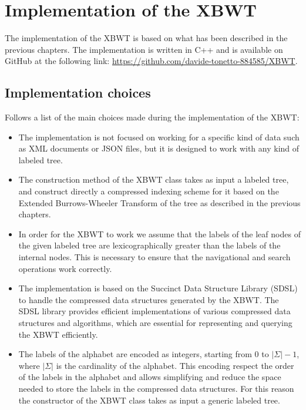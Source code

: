 \section{Implementation of the XBWT}

The implementation of the XBWT is based on what has been described in the previous chapters. The implementation is written in C++ and is available on GitHub at the following link: \url{https://github.com/davide-tonetto-884585/XBWT}.

\subsection{Implementation choices}
Follows a list of the main choices made during the implementation of the XBWT:
\begin{itemize}
    \item The implementation is not focused on working for a specific kind of data such as XML documents or JSON files, but it is designed to work with any kind of labeled tree. 
    \item The construction method of the XBWT class takes as input a labeled tree, and construct directly a compressed indexing scheme for it based on the Extended Burrows-Wheeler Transform of the tree as described in the previous chapters.
    \item In order for the XBWT to work we assume that the labels of the leaf nodes of the given labeled tree are lexicographically greater than the labels of the internal nodes. This is necessary to ensure that the navigational and search operations work correctly.
    \item The implementation is based on the Succinct Data Structure Library (SDSL) to handle the compressed data structures generated by the XBWT. The SDSL library provides efficient implementations of various compressed data structures and algorithms, which are essential for representing and querying the XBWT efficiently.
    \item The labels of the alphabet are encoded as integers, starting from 0 to $|\Sigma| - 1$, where $|\Sigma|$ is the cardinality of the alphabet. This encoding respect the order of the labels in the alphabet and allows simplifying and reduce the space needed to store the labels in the compressed data structures. For this reason the constructor of the XBWT class takes as input a generic labeled tree.
\end{itemize}


